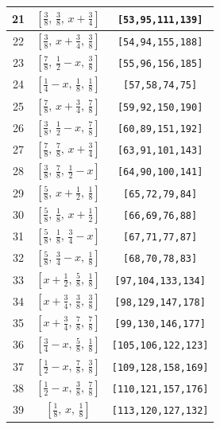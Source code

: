 \documentclass[fleqn,8pt]{jsarticle}
\begin{document}
\begin{longtable}{ccc}
21 & $\left[ \frac{3}{8},\, \frac{3}{8},\, x + \frac{3}{4} \right]$ & {\tt [53,95,111,139]} \\ \hline
22 & $\left[ \frac{3}{8},\, x + \frac{3}{4},\, \frac{3}{8} \right]$ & {\tt [54,94,155,188]} \\ \hline
23 & $\left[ \frac{7}{8},\, \frac{1}{2} - x,\, \frac{3}{8} \right]$ & {\tt [55,96,156,185]} \\ \hline
24 & $\left[ \frac{1}{4} - x,\, \frac{1}{8},\, \frac{1}{8} \right]$ & {\tt [57,58,74,75]} \\ \hline
25 & $\left[ \frac{7}{8},\, x + \frac{3}{4},\, \frac{7}{8} \right]$ & {\tt [59,92,150,190]} \\ \hline
26 & $\left[ \frac{3}{8},\, \frac{1}{2} - x,\, \frac{7}{8} \right]$ & {\tt [60,89,151,192]} \\ \hline
27 & $\left[ \frac{7}{8},\, \frac{7}{8},\, x + \frac{3}{4} \right]$ & {\tt [63,91,101,143]} \\ \hline
28 & $\left[ \frac{3}{8},\, \frac{7}{8},\, \frac{1}{2} - x \right]$ & {\tt [64,90,100,141]} \\ \hline
29 & $\left[ \frac{5}{8},\, x + \frac{1}{2},\, \frac{1}{8} \right]$ & {\tt [65,72,79,84]} \\ \hline
30 & $\left[ \frac{5}{8},\, \frac{1}{8},\, x + \frac{1}{2} \right]$ & {\tt [66,69,76,88]} \\ \hline
31 & $\left[ \frac{5}{8},\, \frac{1}{8},\, \frac{3}{4} - x \right]$ & {\tt [67,71,77,87]} \\ \hline
32 & $\left[ \frac{5}{8},\, \frac{3}{4} - x,\, \frac{1}{8} \right]$ & {\tt [68,70,78,83]} \\ \hline
33 & $\left[ x + \frac{1}{2},\, \frac{5}{8},\, \frac{1}{8} \right]$ & {\tt [97,104,133,134]} \\ \hline
34 & $\left[ x + \frac{3}{4},\, \frac{3}{8},\, \frac{3}{8} \right]$ & {\tt [98,129,147,178]} \\ \hline
35 & $\left[ x + \frac{3}{4},\, \frac{7}{8},\, \frac{7}{8} \right]$ & {\tt [99,130,146,177]} \\ \hline
36 & $\left[ \frac{3}{4} - x,\, \frac{5}{8},\, \frac{1}{8} \right]$ & {\tt [105,106,122,123]} \\ \hline
37 & $\left[ \frac{1}{2} - x,\, \frac{7}{8},\, \frac{3}{8} \right]$ & {\tt [109,128,158,169]} \\ \hline
38 & $\left[ \frac{1}{2} - x,\, \frac{3}{8},\, \frac{7}{8} \right]$ & {\tt [110,121,157,176]} \\ \hline
39 & $\left[ \frac{1}{8},\, x,\, \frac{1}{8} \right]$ & {\tt [113,120,127,132]} \\ \hline

\end{longtable}
\end{document}
